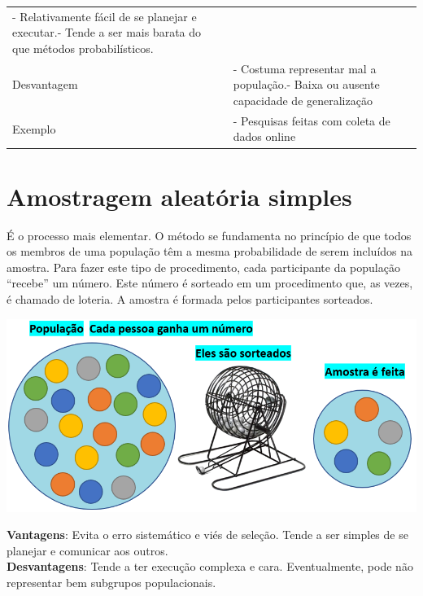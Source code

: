 \documentclass[
]{book}
\begin{document}
\begin{longtable}[]{@{}ll@{}}
\begin{minipage}[t]{0.51\columnwidth}
- Relativamente fácil de se planejar e executar.- Tende a ser mais
barata do que métodos probabilísticos.\strut
\end{minipage}\tabularnewline
\begin{minipage}[t]{0.43\columnwidth}\raggedright
Desvantagem\strut
\end{minipage} & \begin{minipage}[t]{0.51\columnwidth}\raggedright
- Costuma representar mal a população.- Baixa ou ausente capacidade de
generalização\strut
\end{minipage}\tabularnewline
\begin{minipage}[t]{0.43\columnwidth}\raggedright
Exemplo\strut
\end{minipage} & \begin{minipage}[t]{0.51\columnwidth}\raggedright
- Pesquisas feitas com coleta de dados online\strut
\end{minipage}\tabularnewline
\bottomrule
\end{longtable}

\hypertarget{amostragem-aleatuxf3ria-simples}{%
\section{Amostragem aleatória
simples}\label{amostragem-aleatuxf3ria-simples}}

É o processo mais elementar. O método se fundamenta no princípio de que
todos os membros de uma população têm a mesma probabilidade de serem
incluídos na amostra. Para fazer este tipo de procedimento, cada
participante da população ``recebe'' um número. Este número é sorteado
em um procedimento que, as vezes, é chamado de loteria. A amostra é
formada pelos participantes sorteados.

\includegraphics{./img/cap_aas.png}

\textbf{Vantagens}: Evita o erro sistemático e viés de seleção. Tende a
ser simples de se planejar e comunicar aos outros.\\
\textbf{Desvantagens}: Tende a ter execução complexa e cara.
Eventualmente, pode não representar bem subgrupos populacionais.
\end{document}

